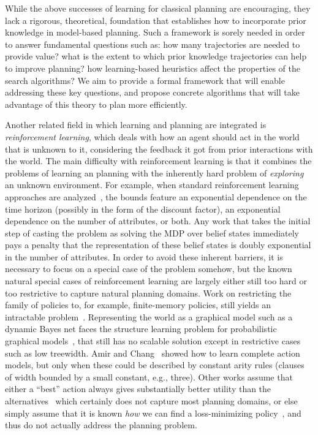 \documentclass[12pt]{article}
\begin{document}
While the above successes of learning for classical planning are encouraging, they lack a rigorous, theoretical, foundation that establishes how to incorporate prior knowledge in model-based planning. Such a framework is sorely needed in order to answer fundamental questions such as: how many trajectories are needed to provide value? what is the extent to which prior knowledge trajectories can help to improve planning? how learning-based heuristics affect the properties of the search algorithms? We aim to provide a formal framework that will enable addressing these key questions, and propose concrete algorithms that will take advantage of this theory to plan more efficiently. 


Another related field in which learning and planning are integrated is {\em reinforcement learning}, which deals with how an agent
should act in the world that is unknown to it, considering the feedback it got from prior interactions with the world. The main difficulty with reinforcement learning is that it combines the problems of learning an planning with the inherently hard problem of {\em exploring} an unknown environment. For example, when standard reinforcement learning approaches are analyzed~\cite{kearns2002POMDPsample,shani2005modelPOMDP}, the bounds feature an exponential dependence on the time horizon (possibly in the form of the discount factor), an exponential dependence on the number of attributes, or both. Any work that takes the initial step of casting the problem as solving the MDP over belief states immediately pays a penalty that the representation of these belief states is doubly exponential in the number of attributes.  In order to avoid these inherent barriers, it is necessary to focus on a special case of the problem somehow, but the known natural special cases of reinforcement learning are largely either still too hard or too restrictive to capture natural planning domains. Work on restricting the family of policies to, for example, finite-memory policies, still yields an intractable problem~\cite{meuleau1999finitestate}. Representing the world as a graphical model such as a dynamic Bayes net faces the structure learning problem for probabilistic graphical models~\cite[Section~19.4]{koller2009pgm}, that still has no scalable solution except in restrictive cases such as low treewidth. 
  Amir and Chang~\cite{amir2008} showed how to learn complete action models, but only when these could be described by constant arity rules (clauses of width bounded by a small constant, e.g., three).
  Other works assume that either a ``best'' action always gives substantially better utility than the alternatives~\cite{fern2006policyIteration} which certainly does not capture most planning domains, or else simply assume that it is known {\em how} we can find a loss-minimizing policy~\cite{lazaric2010policyIteration}, and thus do not actually address the planning problem.
\end{document}
